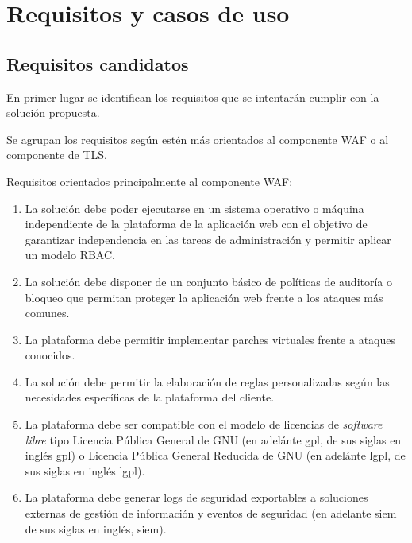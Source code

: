 \chapter{Requisitos y casos de uso}
\section{Requisitos candidatos}
\par En primer lugar se identifican los requisitos que se intentarán cumplir con la solución propuesta.
\par Se agrupan los requisitos según estén más orientados al componente WAF o al componente de TLS.
\par Requisitos orientados principalmente al componente WAF:
\begin{enumerate}
  \item La solución debe poder ejecutarse en un sistema operativo o máquina independiente de la plataforma de la aplicación web con el
    objetivo de garantizar independencia en las tareas de administración y permitir aplicar un modelo RBAC.
  \item La solución debe disponer de un conjunto básico de políticas de auditoría o bloqueo que permitan proteger la aplicación web frente a
    los ataques más comunes.
  \item La plataforma debe permitir implementar parches virtuales frente a ataques conocidos.
  \item La solución debe permitir la elaboración de reglas personalizadas según las necesidades específicas de la plataforma del cliente.
  \item La plataforma debe ser compatible con el modelo de licencias de {\em software libre\cite{softwarelibre}} tipo
    Licencia Pública General de GNU (en adelánte \acrshort{gpl}, de  sus siglas en inglés \acrlong{gpl}) o Licencia Pública General Reducida
    de GNU (en adelánte \acrshort{lgpl}, de  sus siglas en inglés \acrlong{lgpl}).
  \item La plataforma debe generar logs de seguridad exportables a soluciones externas de gestión de información y eventos de seguridad (en
    adelante \acrshort{siem} de sus siglas en inglés, \acrlong{siem}).
\end{enumerate}

